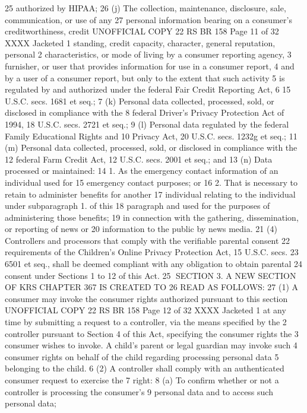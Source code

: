 25 authorized by HIPAA;
26 (j) The collection, maintenance, disclosure, sale, communication, or use of any
27 personal information bearing on a consumer's creditworthiness, credit 
UNOFFICIAL COPY 22 RS BR 158
Page 11 of 32
XXXX Jacketed
1 standing, credit capacity, character, general reputation, personal
2 characteristics, or mode of living by a consumer reporting agency,
3 furnisher, or user that provides information for use in a consumer report,
4 and by a user of a consumer report, but only to the extent that such activity
5 is regulated by and authorized under the federal Fair Credit Reporting Act,
6 15 U.S.C. secs. 1681 et seq.;
7 (k) Personal data collected, processed, sold, or disclosed in compliance with the
8 federal Driver's Privacy Protection Act of 1994, 18 U.S.C. secs. 2721 et seq.;
9 (l) Personal data regulated by the federal Family Educational Rights and
10 Privacy Act, 20 U.S.C. secs. 1232g et seq.;
11 (m) Personal data collected, processed, sold, or disclosed in compliance with the
12 federal Farm Credit Act, 12 U.S.C. secs. 2001 et seq.; and
13 (n) Data processed or maintained:
14 1. As the emergency contact information of an individual used for
15 emergency contact purposes; or
16 2. That is necessary to retain to administer benefits for another
17 individual relating to the individual under subparagraph 1. of this
18 paragraph and used for the purposes of administering those benefits;
19 in connection with the gathering, dissemination, or reporting of news or
20 information to the public by news media.
21 (4) Controllers and processors that comply with the verifiable parental consent
22 requirements of the Children's Online Privacy Protection Act, 15 U.S.C. secs.
23 6501 et seq., shall be deemed compliant with any obligation to obtain parental
24 consent under Sections 1 to 12 of this Act.
25 SECTION 3. A NEW SECTION OF KRS CHAPTER 367 IS CREATED TO
26 READ AS FOLLOWS:
27 (1) A consumer may invoke the consumer rights authorized pursuant to this section 
UNOFFICIAL COPY 22 RS BR 158
Page 12 of 32
XXXX Jacketed
1 at any time by submitting a request to a controller, via the means specified by the
2 controller pursuant to Section 4 of this Act, specifying the consumer rights the
3 consumer wishes to invoke. A child's parent or legal guardian may invoke such
4 consumer rights on behalf of the child regarding processing personal data
5 belonging to the child.
6 (2) A controller shall comply with an authenticated consumer request to exercise the
7 right:
8 (a) To confirm whether or not a controller is processing the consumer's
9 personal data and to access such personal data;
